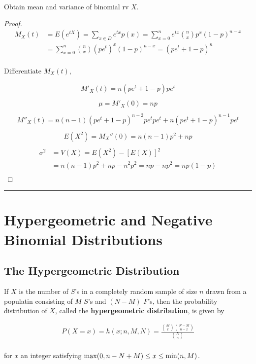 Obtain mean and variance of binomial rv $X$.

\begin{proof}
    \begin{align*}
        M_X(t) & = E(e^{tX}) = \sum\limits_{x\in D} e^{tx} p(x) = \sum\limits_{x=0}^n e^{tx}\binom{n}{x} p^x (1-p)^{n-x} \\
        & = \sum\limits_{x=0}^n \binom{n}{x}(pe^t)^x(1-p)^{n-x} = (pe^t + 1 - p) ^ n \\
    \end{align*}

    Differentiate $M_X(t)$,

    \begin{align*}
        M'_X(t) = n(pe^t + 1 - p)pe^t \\
    \end{align*}
    \begin{align*}
        \mu = M'_X(0) = np \\
    \end{align*}
    \begin{align*}
        M''_X(t) = n(n - 1)(pe^t + 1 - p) ^{n-2} pe^tpe^t + n(pe^t + 1 - p)^{n - 1}pe^t \\
    \end{align*}
    \begin{align*}
        E(X^2) = M_X''(0) = n(n - 1)p^2 + np \\
    \end{align*}
    \begin{align*}
        \sigma^2 & = V(X) = E(X^2) - [E(X)]^2 \\
        & = n(n - 1)p^2 + np - n^2p^2 = np - np^2 = np(1 - p) \\
    \end{align*}
\end{proof}

\noindent\rule{\textwidth}{1pt}

\section{Hypergeometric and Negative Binomial Distributions}

\subsection{The Hypergeometric Distribution}

\begin{proposition}
    If $X$ is the number of $S$'s in a completely random sample of size $n$ drawn from a populatin consisting of $M$ $S$'s and $(N-M)$ $F$'s, then  the probability distribution of $X$, called the \textbf{hypergeometric distribution}, is given by 
    
    \begin{align*}
        P(X = x) = h(x;n, M, N) = \frac{\binom{M}{x}\binom{N-M}{n-x}}{\binom{N}{n}} \\
    \end{align*}

    for $x$ an integer satisfying ${\rm max}(0, n - N + M)\leq x \leq {\rm min}(n, M)$.
\end{proposition}


